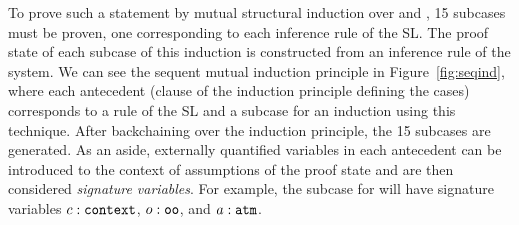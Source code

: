 To prove such a statement by mutual structural induction over  and , 15 subcases must be proven, one corresponding to each inference rule of the SL. The proof state of each subcase of this induction is constructed from an inference rule of the system.
%
We can see the sequent mutual induction principle in Figure~\ref{fig:seqind}, where each antecedent (clause of the induction principle defining the cases) corresponds to a rule of the SL and a subcase for an induction using this technique. 
After backchaining over the induction principle, the 15 subcases are generated. As an aside, externally quantified variables in each antecedent can be introduced to the context of assumptions of the proof state and are then considered \emph{signature variables}. For example, the subcase for \rlnmsbc{} will have signature variables $c : \texttt{context}$, $o : \texttt{oo}$, and $a : \texttt{atm}$.
